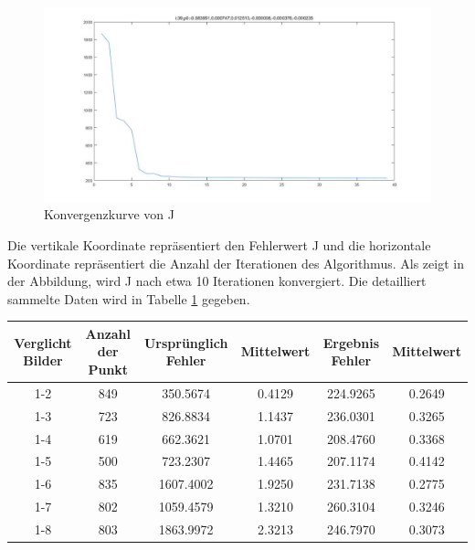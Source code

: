 \begin{figure}[H]
 \centering 
  \includegraphics[keepaspectratio,width=1.0\textwidth]{images/6_Auswertung/J8.pdf}
 \caption{Konvergenzkurve von J}
 \label{fig:Konvergenzkurve}
\end{figure}

Die vertikale Koordinate repräsentiert den Fehlerwert J und die horizontale Koordinate repräsentiert die Anzahl der Iterationen des Algorithmus. Als zeigt in der Abbildung, wird J nach etwa 10 Iterationen konvergiert. Die detailliert sammelte Daten wird in Tabelle \ref{tbl:Daten des Fehlers} gegeben.

\begin{table}[htb]
	\label{tbl:Daten des Fehlers}
	\footnotesize
	\centering
	\begin{tabular}{|c|c|c|c|c|c|}
	\toprule
	\textbf{Verglicht Bilder} & \textbf{Anzahl der Punkt} & \textbf{Ursprünglich Fehler} & \textbf{Mittelwert} &\textbf{Ergebnis Fehler} & \textbf{Mittelwert}\\
	\midrule
	1-2 & 849 & 350.5674 & 0.4129 & 224.9265 & 0.2649\\ 
	1-3 & 723 & 826.8834 & 1.1437 & 236.0301 & 0.3265\\ 
	1-4 & 619 & 662.3621 & 1.0701 & 208.4760 & 0.3368\\ 
	1-5 & 500 & 723.2307 & 1.4465 & 207.1174 & 0.4142\\ 
	1-6 & 835 & 1607.4002 & 1.9250& 231.7138 & 0.2775\\ 
	1-7 & 802 & 1059.4579 & 1.3210& 260.3104 & 0.3246\\ 
	1-8 & 803 & 1863.9972 & 2.3213& 246.7970 & 0.3073\\ 
	\bottomrule
	\end{tabular}
\end{table} 

